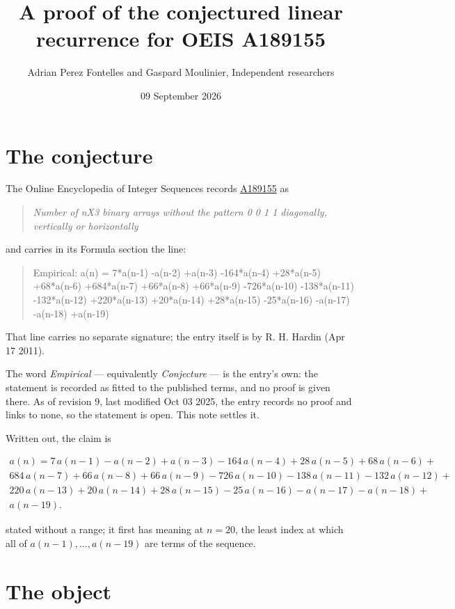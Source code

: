 \documentclass[11pt]{article}
\title{A proof of the conjectured linear recurrence for OEIS A189155}
\author{Adrian Perez Fontelles and Gaspard Moulinier, Independent researchers}
\date{09 September 2026}
\theoremstyle{definition}
\begin{document}
\maketitle
\section{The conjecture}

The Online Encyclopedia of Integer Sequences records \href{https://oeis.org/A189155}{A189155} as

\begin{quote}\itshape Number of nX3 binary arrays without the pattern 0 0 1 1 diagonally, vertically or horizontally\end{quote}

and carries in its Formula section the line:

\begin{quote}\ttfamily Empirical: a(n) = 7*a(n-1) -a(n-2) +a(n-3) -164*a(n-4) +28*a(n-5) +68*a(n-6) +684*a(n-7) +66*a(n-8) +66*a(n-9) -726*a(n-10) -138*a(n-11) -132*a(n-12) +220*a(n-13) +20*a(n-14) +28*a(n-15) -25*a(n-16) -a(n-17) -a(n-18) +a(n-19)\end{quote}

That line carries no separate signature; the entry itself is by R. H. Hardin (Apr 17 2011).

The word {\itshape Empirical} --- equivalently {\itshape Conjecture} --- is the entry's own: the statement is recorded as fitted to the published terms, and no proof is given there. As of revision 9, last modified Oct 03 2025, the entry records no proof and links to none, so the statement is open. This note settles it.

Written out, the claim is

\begin{multline*} a(n) = 7\,a(n-1) - a(n-2) + a(n-3) - 164\,a(n-4) + 28\,a(n-5) + 68\,a(n-6) + \\ 684\,a(n-7) + 66\,a(n-8) + 66\,a(n-9) - 726\,a(n-10) - 138\,a(n-11) - 132\,a(n-12) + \\ 220\,a(n-13) + 20\,a(n-14) + 28\,a(n-15) - 25\,a(n-16) - a(n-17) - a(n-18) + \\ a(n-19). \end{multline*}

stated without a range; it first has meaning at $n = 20$, the least index at which all of $a(n-1),\dots,a(n-19)$ are terms of the sequence.

\section{The object}
\end{document}
